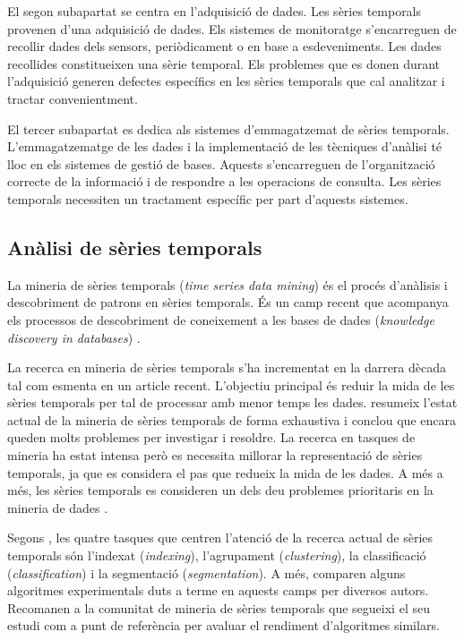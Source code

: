 El segon subapartat se centra en l'adquisició de dades. Les sèries
temporals provenen d'una adquisició de dades. Els sistemes de
monitoratge s'encarreguen de recollir dades dels sensors,
periòdicament o en base a esdeveniments. Les dades recollides
constitueixen una sèrie temporal. Els problemes que es donen durant
l'adquisició generen defectes específics en les sèries temporals que
cal analitzar i tractar convenientment.

El tercer subapartat es dedica als sistemes d'emmagatzemat de sèries
temporals. L'emmagatzematge de les dades i la implementació de les
tècniques d'anàlisi té lloc en els sistemes de gestió de
bases. Aquests s'encarreguen de l'organització correcte de la
informació i de respondre a les operacions de consulta. Les sèries
temporals necessiten un tractament específic per part d'aquests
sistemes.



\subsection{Anàlisi de sèries temporals}

La mineria de sèries temporals (\emph{time series data mining}) és el procés d'anàlisis i descobriment de patrons en sèries temporals. És un camp recent que acompanya els processos de descobriment de coneixement a les bases de dades (\emph{knowledge discovery in databases}) \parencite{last01}.


La recerca en mineria de sèries temporals s'ha incrementat en la darrera dècada tal com esmenta \textcite{fu11} en un article recent. L'objectiu principal és reduir la mida de les sèries temporals per tal de processar amb menor temps les dades.
\citeauthor{fu11} resumeix l'estat actual de la mineria de sèries temporals de forma exhaustiva i conclou que encara queden molts problemes per investigar i resoldre. La recerca en tasques de mineria ha estat intensa però es necessita millorar la representació de sèries temporals, ja que es considera el pas que redueix la mida de les dades. A més a més, les sèries temporals es consideren un dels deu problemes prioritaris  en la mineria de dades \parencite{yangwu06}.

Segons \textcite{keogh02}, les quatre tasques que centren l'atenció de la recerca actual de sèries temporals són l'indexat (\emph{indexing}), l'agrupament (\emph{clustering}), la classificació (\emph{classification}) i la segmentació (\emph{segmentation}). A més, \citeauthor{keogh02} comparen  alguns algoritmes experimentals duts a terme en aquests camps per diversos autors. Recomanen a la comunitat de mineria de sèries temporals que segueixi el seu estudi com a punt de referència per avaluar el rendiment d'algoritmes similars.

